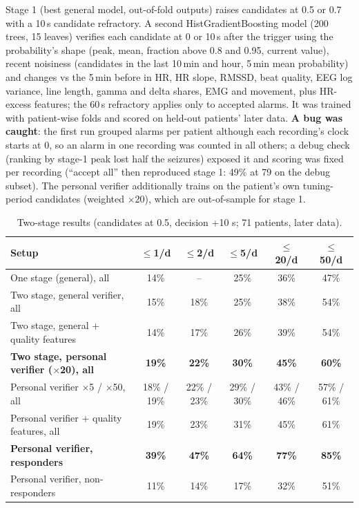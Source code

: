 Stage 1 (best general model, out-of-fold outputs) raises candidates at 0.5 or 0.7 with a 10\,s candidate refractory. A second HistGradientBoosting model (200 trees, 15 leaves) verifies each candidate at 0 or 10\,s after the trigger using the probability's shape (peak, mean, fraction above 0.8 and 0.95, current value), recent noisiness (candidates in the last 10\,min and hour, 5\,min mean probability) and changes vs the 5\,min before in HR, HR slope, RMSSD, beat quality, EEG log variance, line length, gamma and delta shares, EMG and movement, plus HR-excess features; the 60\,s refractory applies only to accepted alarms. It was trained with patient-wise folds and scored on held-out patients' later data. \textbf{A bug was caught}: the first run grouped alarms per patient although each recording's clock starts at 0, so an alarm in one recording was counted in all others; a debug check (ranking by stage-1 peak lost half the seizures) exposed it and scoring was fixed per recording (``accept all'' then reproduced stage 1: 49\% at 79 \FAd{} on the debug subset). The personal verifier additionally trains on the patient's own tuning-period candidates (weighted $\times$20), which are out-of-sample for stage 1.

\begin{table}[H]
\centering\small
\caption{Two-stage results (candidates at 0.5, decision +10 s; 71 patients, later data).}
\setlength{\tabcolsep}{4pt}
\begin{tabular}{@{}lccccc@{}}
\toprule
Setup & $\le$1/d & $\le$2/d & $\le$5/d & $\le$20/d & $\le$50/d \\
\midrule
One stage (general), all & 14\% & -- & 25\% & 36\% & 47\% \\
Two stage, general verifier, all & 15\% & 18\% & 25\% & 38\% & 54\% \\
Two stage, general + quality features & 14\% & 17\% & 26\% & 39\% & 54\% \\
\textbf{Two stage, personal verifier ($\times$20), all} & \textbf{19\%} & \textbf{22\%} & \textbf{30\%} & \textbf{45\%} & \textbf{60\%} \\
Personal verifier $\times$5 / $\times$50, all & 18\% / 19\% & 22\% / 23\% & 29\% / 30\% & 43\% / 46\% & 57\% / 61\% \\
Personal verifier + quality features, all & 19\% & 23\% & 31\% & 45\% & 61\% \\
\textbf{Personal verifier, responders} & \textbf{39\%} & \textbf{47\%} & \textbf{64\%} & \textbf{77\%} & \textbf{85\%} \\
Personal verifier, non-responders & 11\% & 14\% & 17\% & 32\% & 51\% \\
\bottomrule
\end{tabular}
\end{table}

